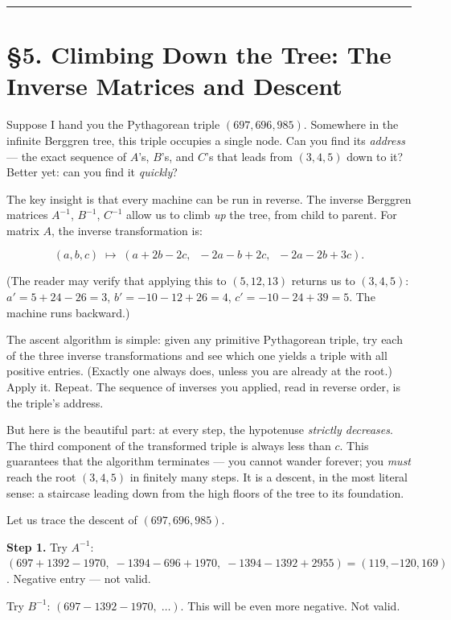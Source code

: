 \documentclass[11pt,openany]{book}
\theoremstyle{definition}
\theoremstyle{plain}
\theoremstyle{remark}
\begin{document}
\bigskip\noindent\rule{\textwidth}{0.4pt}\bigskip


\section{§5. Climbing Down the Tree: The Inverse Matrices and Descent}


Suppose I hand you the Pythagorean triple $(697, 696, 985)$. Somewhere in the infinite Berggren tree, this triple occupies a single node. Can you find its \textit{address} — the exact sequence of $A$'s, $B$'s, and $C$'s that leads from $(3, 4, 5)$ down to it? Better yet: can you find it \textit{quickly}?

The key insight is that every machine can be run in reverse. The inverse Berggren matrices $A^{-1}$, $B^{-1}$, $C^{-1}$ allow us to climb \textit{up} the tree, from child to parent. For matrix $A$, the inverse transformation is:

$$(a, b, c) \;\longmapsto\; (a + 2b - 2c,\;\; -2a - b + 2c,\;\; -2a - 2b + 3c).$$

(The reader may verify that applying this to $(5, 12, 13)$ returns us to $(3, 4, 5)$: $a' = 5 + 24 - 26 = 3$, $b' = -10 - 12 + 26 = 4$, $c' = -10 - 24 + 39 = 5$. The machine runs backward.)

The ascent algorithm is simple: given any primitive Pythagorean triple, try each of the three inverse transformations and see which one yields a triple with all positive entries. (Exactly one always does, unless you are already at the root.) Apply it. Repeat. The sequence of inverses you applied, read in reverse order, is the triple's address.

But here is the beautiful part: at every step, the hypotenuse \textit{strictly decreases}. The third component of the transformed triple is always less than $c$. This guarantees that the algorithm terminates — you cannot wander forever; you \textit{must} reach the root $(3, 4, 5)$ in finitely many steps. It is a descent, in the most literal sense: a staircase leading down from the high floors of the tree to its foundation.

Let us trace the descent of $(697, 696, 985)$.

\textbf{Step 1.} Try $A^{-1}$: $(697 + 1392 - 1970,\; -1394 - 696 + 1970,\; -1394 - 1392 + 2955) = (119, -120, 169)$. Negative entry — not valid.

Try $B^{-1}$: $(697 - 1392 - 1970,\;\ldots)$. This will be even more negative. Not valid.
\end{document}

